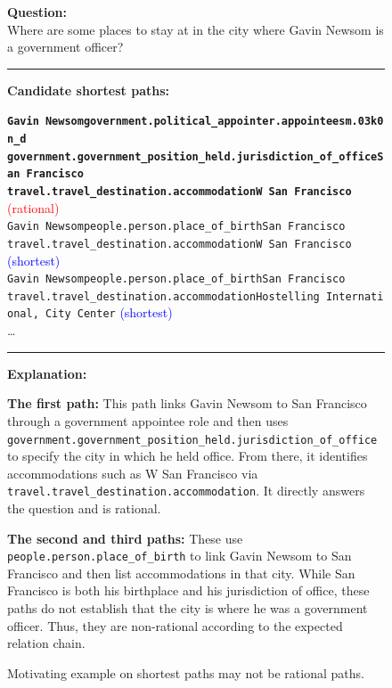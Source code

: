 \begin{figure}[t]
\begin{tcolorbox}[colback=gray!5!white,
                  colframe=gray!75!black,
                  title=WebQTrn-2237\_723ad981dc68e3cfe82e7134c8ca8fdb]
\scriptsize

\textbf{Question:}\\
Where are some places to stay at in the city where Gavin Newsom is a government officer?

\rule{\linewidth}{0.4pt}

\textbf{Candidate shortest paths:}\\[2pt]
{\raggedright
\texttt{\textbf{Gavin Newsom\patharrow government.political\_appointer.appointees\patharrow m.03k0n\_d\patharrow \\ government.government\_position\_held.jurisdiction\_of\_office\patharrow San Francisco\patharrow \\ travel.travel\_destination.accommodation\patharrow W San Francisco}}\hfill
\textcolor{red}{(rational)}\\[6pt]

\texttt{Gavin Newsom\patharrow people.person.place\_of\_birth\patharrow San Francisco\patharrow \\ travel.travel\_destination.accommodation\patharrow W San Francisco}\hfill
\textcolor{blue}{(shortest)}\\[6pt]

\texttt{Gavin Newsom\patharrow people.person.place\_of\_birth\patharrow San Francisco\patharrow \\ travel.travel\_destination.accommodation\patharrow Hostelling International, City Center}\hfill
\textcolor{blue}{(shortest)}\\[6pt]
\ldots
\par}

\rule{\linewidth}{0.4pt}

\textbf{Explanation:}\\[2pt]
{\raggedright
\textbf{The first path:} This path links Gavin Newsom to San Francisco through a government appointee role and then uses \texttt{government.government\_position\_held.jurisdiction\_of\_office} to specify the city in which he held office. From there, it identifies accommodations such as W San Francisco via \texttt{travel.travel\_destination.accommodation}. It directly answers the question and is rational.\par\vspace{6pt}

\textbf{The second and third paths:} These use \texttt{people.person.place\_of\_birth} to link Gavin Newsom to San Francisco and then list accommodations in that city. While San Francisco is both his birthplace and his jurisdiction of office, these paths do not establish that the city is where he was a government officer. Thus, they are non-rational according to the expected relation chain.\par}
\end{tcolorbox}
\caption{Motivating example on shortest paths may not be rational paths.}
\label{fig:type2_no6}
\end{figure}


